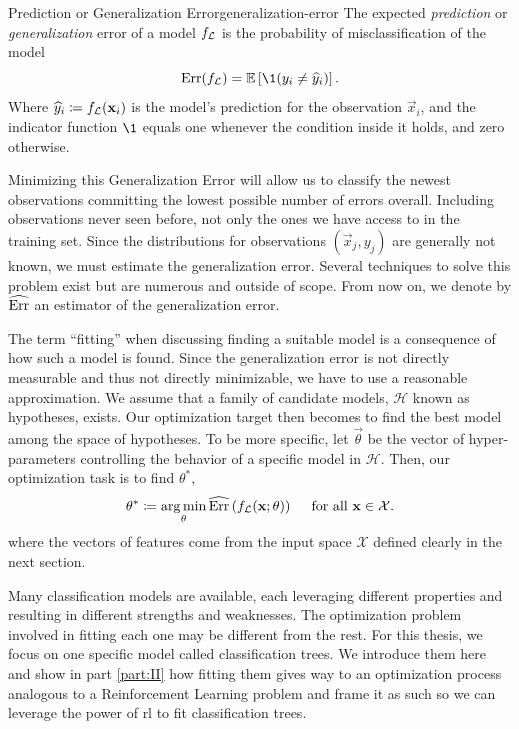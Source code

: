 \begin{dfn}{Prediction or Generalization Error}{generalization-error}
    The expected \emph{prediction} or \emph{generalization} error of a model
    $f_{\mathcal{L}}$ is the probability of misclassification of the model
    \[
        \Err (f_\L) = \mathbb{E} \left[ \1 (y_i \neq \widehat{y}_i)  \right].
    \]
    Where $\widehat{y}_i \coloneqq f_{\mathcal{L}} (\mathbf{x}_i)$ is the model's prediction
    for the observation $\vec{x}_i$, and the indicator function $\1$ equals one
    whenever the condition inside it holds, and zero otherwise.
\end{dfn}

Minimizing this Generalization Error will allow us to classify the newest
observations committing the lowest possible number of errors overall.
Including observations never seen before, not only the ones we have access to in
the training set. Since the distributions for observations $(\vec{x}_j, y_j)$
are generally not known, we must estimate the generalization error. Several
techniques to solve this problem exist but are numerous and outside of scope.
From now on, we denote by $\widehat{\operatorname*{Err}}$ an estimator of the generalization
error.

The term ``fitting'' when discussing finding a suitable model is a consequence
of how such a model is found. Since the generalization error is not directly
measurable and thus not directly minimizable, we have to use a reasonable
approximation. We assume that a family of candidate models, $\mathcal{H}$ known
as hypotheses, exists. Our optimization target then becomes to find the best
model among the space of hypotheses. To be more specific, let $\vec{\theta}$ be
the vector of hyper-parameters controlling the behavior of a specific model in
$\mathcal{H}$.  Then, our optimization task is to find $\theta^{*}$,
\[
    \theta^{*} \coloneqq \operatorname*{arg\,min}_{\theta} \widehat{\operatorname*{Err}}\left(f_{\mathcal{L}} (\mathbf{x}; \theta) \right) \quad \text{ for all } \mathbf{x} \in \mathcal{X}.
\]
where the vectors of features come from the input space $\mathcal{X}$ defined
clearly in the next section.

Many classification models are available, each leveraging different properties
and resulting in different strengths and weaknesses. The optimization problem
involved in fitting each one may be different from the rest. For this thesis, we
focus on one specific model called classification trees. We introduce them here
and show in part \ref{part:II} how fitting them gives way to an optimization
process analogous to a Reinforcement Learning problem and frame it as such so we
can leverage the power of \ac{rl} to fit classification trees.

